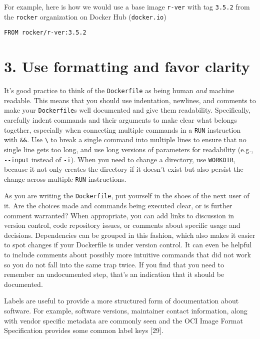 \documentclass[10pt,letterpaper]{article}
\begin{document}
For example, here is how we would use a base image \texttt{r-ver} with
tag \texttt{3.5.2} from the \texttt{rocker} organization on Docker Hub
(\texttt{docker.io})

\begin{verbatim}
FROM rocker/r-ver:3.5.2
\end{verbatim}

\hypertarget{use-formatting-and-favor-clarity}{%
\section{3. Use formatting and favor
clarity}\label{use-formatting-and-favor-clarity}}

It's good practice to think of the \texttt{Dockerfile} as being human
\emph{and} machine readable. This means that you should use indentation,
newlines, and comments to make your \texttt{Dockerfile}s well documented
and give them readability. Specifically, carefully indent commands and
their arguments to make clear what belongs together, especially when
connecting multiple commands in a \texttt{RUN} instruction with
\texttt{\&\&}. Use \texttt{\textbackslash{}} to break a single command
into multiple lines to ensure that no single line gets too long, and use
long versions of parameters for readability (e.g., \texttt{-\/-input}
instead of \texttt{-i}). When you need to change a directory, use
\texttt{WORKDIR}, because it not only creates the directory if it
doesn't exist but also persist the change across multiple \texttt{RUN}
instructions.

As you are writing the \texttt{Dockerfile}, put yourself in the shoes of
the next user of it. Are the choices made and commands being executed
clear, or is further comment warranted? When appropriate, you can add
links to discussion in version control, code repository issues, or
comments about specific usage and decisions. Dependencies can be grouped
in this fashion, which also makes it easier to spot changes if your
Dockerfile is under version control. It can even be helpful to include
comments about possibly more intuitive commands that did not work so you
do not fall into the same trap twice. If you find that you need to
remember an undocumented step, that's an indication that it should be
documented.

Labels are useful to provide a more structured form of documentation
about software. For example, software versions, maintainer contact
information, along with vendor specific metadata are commonly seen and
the OCI Image Format Specification provides some common label keys
{[}29{]}.
\end{document}
